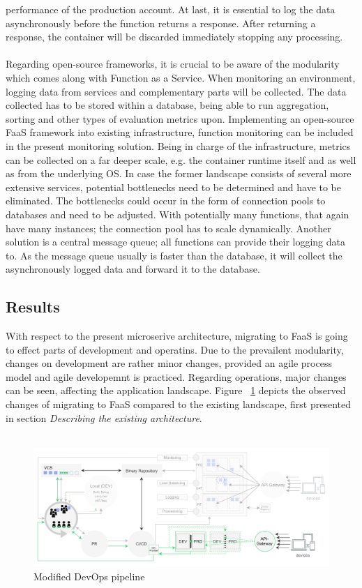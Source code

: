 \documentclass[11pt]{article}
\begin{document}
performance of the production account. At last, it is essential to log the data asynchronously before the function returns a response. After returning a response, the container will be discarded immediately stopping any processing.\\\\ Regarding open-source frameworks, it is crucial to be aware of the modularity which comes along with Function as a Service. When monitoring an environment, logging data from services and complementary parts will be collected. The data collected has to be stored within a database, being able to run aggregation, sorting and other types of evaluation metrics upon. Implementing an open-source FaaS framework into existing infrastructure, function monitoring can be included in the present monitoring solution. Being in charge of the infrastructure, metrics can be collected on a far deeper scale, e.g. the container runtime itself and as well as from the underlying OS. In case the former landscape consists of several more extensive services, potential bottlenecks need to be determined and have to be eliminated. The bottlenecks could occur in the form of connection pools to databases and need to be adjusted. With potentially many functions, that again have many instances; the connection pool has to scale dynamically. Another solution is a central message queue; all functions can provide their logging data to. As the message queue usually is faster than the database, it will collect the asynchronously logged data and forward it to the database.
\subsection{Results}
With respect to the present microserive architecture, migrating to FaaS is going to effect parts of development and operatins. Due to the prevailent modularity, changes on development are rather minor changes, provided an agile process model and agile developemnt is practiced. Regarding operations, major changes can be seen, affecting the application landscape. Figure ~\ref{fig:devopsModified} depicts the observed changes of migrating to FaaS compared to the existing landscape, first presented in section \textit{Describing the existing architecture}. \\\\ 

\begin{figure}[H]
  \caption{Modified DevOps pipeline}
  \label{fig:devopsModified}
  \centering
  \includegraphics[width=1\textwidth]{devopsModified}
\end{figure}
\newpage
\end{document}
